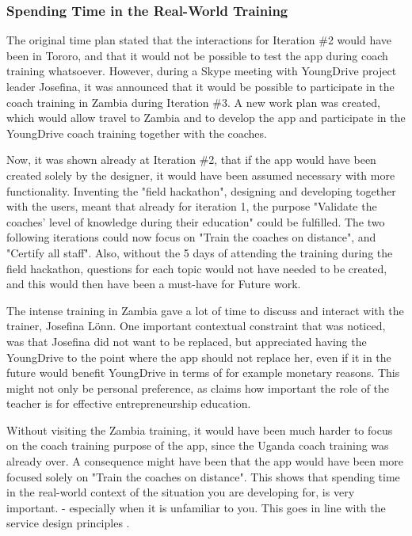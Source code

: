   \subsubsection{Spending Time in the Real-World Training}
  The original time plan stated that the interactions for Iteration \#2 would have been in Tororo, and that it would not be possible to test the app during coach training whatsoever. However, during a Skype meeting with YoungDrive project leader Josefina, it was announced that it would be possible to participate in the coach training in Zambia during Iteration \#3. A new work plan was created, which would allow travel to Zambia and to develop the app and participate in the YoungDrive coach training together with the coaches.


  Now, it was shown already at Iteration \#2, that if the app would have been created solely by the designer, it would have been assumed necessary with more functionality. Inventing the "field hackathon", designing and developing together with the users, meant that already for iteration 1, the purpose "Validate the coaches' level of knowledge during their education" could be fulfilled. The two following iterations could now focus on "Train the coaches on distance", and "Certify all staff". Also, without the 5 days of attending the training during the field hackathon, questions for each topic would not have needed to be created, and this would then have been a must-have for Future work. %

  The intense training in Zambia gave a lot of time to discuss and interact with the trainer, Josefina Lönn. One important contextual constraint that was noticed, was that Josefina did not want to be replaced, but appreciated having the YoungDrive to the point where the app should not replace her, even if it in the future would benefit YoungDrive in terms of for example monetary reasons. This might not only be personal preference, as \cite{ruskovaara} claims how important the role of the teacher is for effective entrepreneurship education.

  Without visiting the Zambia training, it would have been much harder to focus on the coach training purpose of the app, since the Uganda coach training was already over. A consequence might have been that the app would have been more focused solely on "Train the coaches on distance". This shows that spending time in the real-world context of the situation you are developing for, is very important. - especially when it is unfamiliar to you. This goes in line with the service design principles \citep{stickdorn}.

